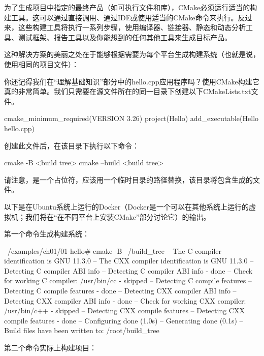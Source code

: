 
为了生成项目中指定的最终产品（如可执行文件和库），CMake必须运行适当的构建工具。这可以通过直接调用、通过IDE或使用适当的CMake命令来执行。反过来，这些构建工具将执行一系列步骤，使用编译器、链接器、静态和动态分析工具、测试框架、报告工具以及你能想到的任何其他工具来生成目标产品。

这种解决方案的美丽之处在于能够根据需要为每个平台生成构建系统（也就是说，使用相同的项目文件）：


你还记得我们在“理解基础知识”部分中的hello.cpp应用程序吗？使用CMake构建它真的非常简单。我们只需要在源文件所在的同一目录下创建以下CMakeLists.txt文件。


\begin{cmake}
cmake_minimum_required(VERSION 3.26)
project(Hello)
add_executable(Hello hello.cpp)
\end{cmake}

创建此文件后，在该目录下执行以下命令：

\begin{shell}
cmake -B <build tree>
cmake --build <build tree>
\end{shell}

请注意，是一个占位符，应该用一个临时目录的路径替换，该目录将包含生成的文件。

以下是在Ubuntu系统上运行的Docker（Docker是一个可以在其他系统上运行的虚拟机；我们将在“在不同平台上安装CMake”部分讨论它）的输出。

第一个命令生成构建系统：

\begin{shell}
~/examples/ch01/01-hello# cmake -B ~/build_tree
-- The C compiler identification is GNU 11.3.0
-- The CXX compiler identification is GNU 11.3.0
-- Detecting C compiler ABI info
-- Detecting C compiler ABI info - done
-- Check for working C compiler: /usr/bin/cc - skipped
-- Detecting C compile features
-- Detecting C compile features - done
-- Detecting CXX compiler ABI info
-- Detecting CXX compiler ABI info - done
-- Check for working CXX compiler: /usr/bin/c++ - skipped
-- Detecting CXX compile features
-- Detecting CXX compile features - done
-- Configuring done (1.0s)
-- Generating done (0.1s)
-- Build files have been written to: /root/build_tree
\end{shell}

第二个命令实际上构建项目：

